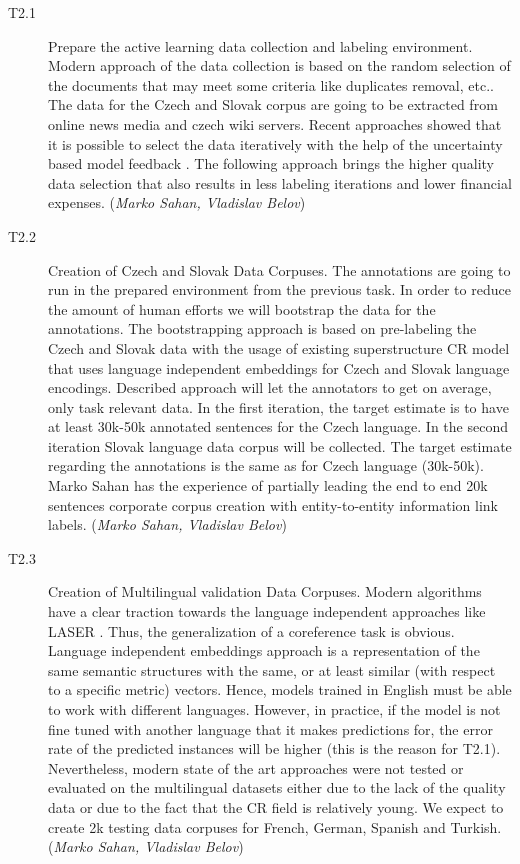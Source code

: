 \begin{description}
	\item [T2.1] Prepare the active learning data collection and labeling environment.
Modern approach of the data collection is based on the random selection of the documents that may meet some criteria like duplicates removal, etc.. The data for the Czech and Slovak corpus are going to be extracted from online news media and czech wiki servers. Recent approaches showed that it is possible to select the data iteratively with the help of the uncertainty based model feedback \cite{gal2017deep, lowell2018practical}. The following approach brings the higher quality data selection that also results in less labeling iterations and lower financial expenses. (\textit{Marko Sahan, Vladislav Belov})
	\item [T2.2] Creation of Czech and Slovak Data Corpuses. The annotations are going to run in the prepared environment from the previous task. In order to reduce the amount of human efforts we will bootstrap the data for the annotations. The bootstrapping approach is based on pre-labeling the Czech and Slovak data with the usage of existing superstructure CR model that uses language independent embeddings for Czech and Slovak language encodings. Described approach will let the annotators to get on average, only task relevant data.
In the first iteration, the target estimate is to have at least 30k-50k annotated sentences for the Czech language. In the second iteration Slovak language data corpus will be collected. The target estimate regarding the annotations is the same as for Czech language (30k-50k). Marko Sahan has the experience of partially leading the end to end 20k sentences corporate corpus creation with entity-to-entity information link labels.  (\textit{Marko Sahan, Vladislav Belov})
	\item [T2.3] Creation of Multilingual validation Data Corpuses. 
Modern algorithms have a clear traction towards the language independent approaches like LASER \cite{artetxe2019massively}. Thus, the generalization of a coreference task is obvious. Language independent embeddings approach is a representation of the same semantic structures with the same, or at least similar (with respect to a specific metric) vectors. Hence, models trained in English must be able to work with different languages. However, in practice, if the model is not fine tuned with another language that it makes predictions for, the error rate of the predicted instances will be higher (this is the reason for T2.1). Nevertheless, modern state of the art approaches were not tested or evaluated on the multilingual datasets either due to the lack of the quality data or due to the fact that the CR field is relatively young. We expect to create 2k testing data corpuses for French, German, Spanish and Turkish. (\textit{Marko Sahan, Vladislav Belov})
\end{description}


